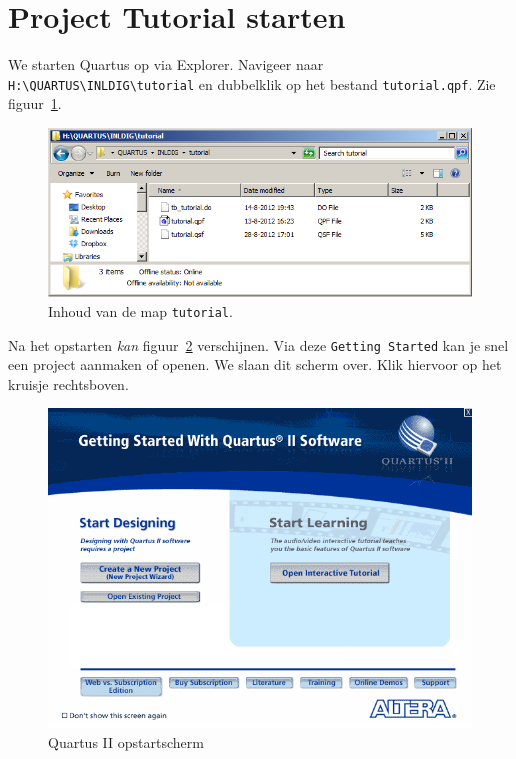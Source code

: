 \documentclass[a4paper,12pt,fleqn,twoside]{book}
\def\tutpicscale{0.455}
\begin{document}
\vfill

\newpage
\section{Project Tutorial starten}
\label{sec:projecttutorialstarten}
We starten Quartus op via Explorer. Navigeer naar
\lstinline|H:\QUARTUS\INLDIG\tutorial| en dubbelklik op het bestand
\lstinline|tutorial.qpf|. Zie figuur~\ref{fig:010tutorialmap}.

\begin{figure}[H]
\centering
\includegraphics[scale=\tutpicscale]{010tutorialmap}
\caption{Inhoud van de map \lstinline|tutorial|.}
\label{fig:010tutorialmap}
\end{figure}

Na het opstarten \textsl{kan} figuur~\ref{fig:011infoscreen} verschijnen. Via
deze \texttt{Getting Started} kan je snel een project aanmaken of openen. We
slaan dit scherm over. Klik hiervoor op het kruisje rechtsboven.

\begin{figure}[H]
\centering
\includegraphics[scale=\tutpicscale]{011infoscreen.png}
\caption{Quartus II opstartscherm}
\label{fig:011infoscreen}
\end{figure}
\end{document}
